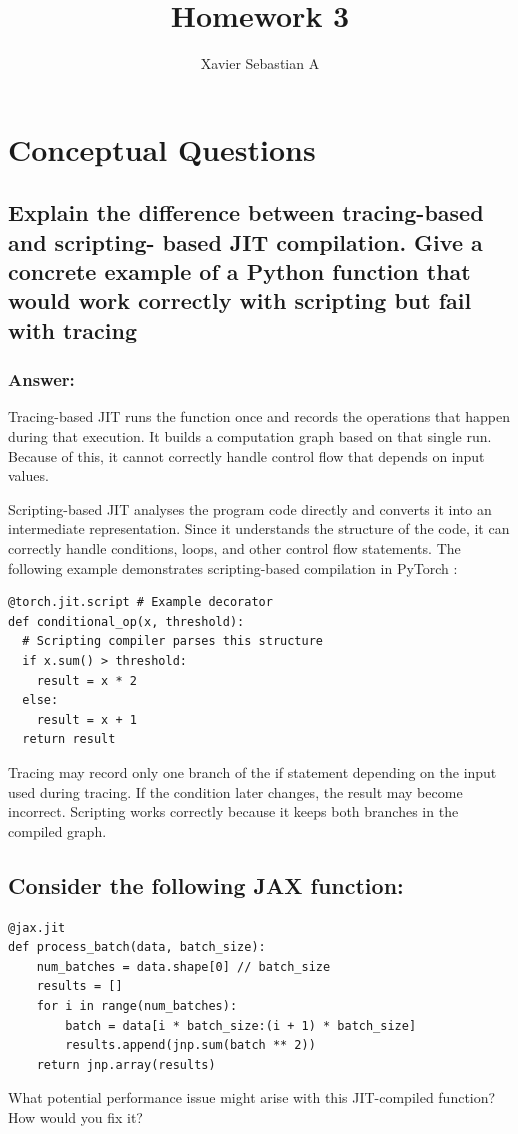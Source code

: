 \documentclass{article}
\title{Homework 3}
\author{Xavier Sebastian A}
\begin{document}
\maketitle
\section{Conceptual Questions}
\subsection{Explain the difference between tracing-based and scripting-
based JIT compilation. Give a concrete example of a Python function
that would work correctly with scripting but fail with tracing}
\subsubsection*{Answer:}
Tracing-based JIT runs the function once and records the operations that happen during that execution. 
It builds a computation graph based on that single run. 
Because of this, it cannot correctly handle control flow that depends on input values.

Scripting-based JIT analyses the program code directly and converts it into an intermediate representation. 
Since it understands the structure of the code, it can correctly handle conditions, loops, and other control flow statements.
The following example demonstrates scripting-based compilation in PyTorch \cite{jit_compilation_ml}:

\begin{lstlisting}[style=py]
@torch.jit.script # Example decorator
def conditional_op(x, threshold):
  # Scripting compiler parses this structure
  if x.sum() > threshold:
    result = x * 2
  else:
    result = x + 1
  return result
\end{lstlisting}
Tracing may record only one branch of the if statement depending on the input used during tracing. 
If the condition later changes, the result may become incorrect. 
Scripting works correctly because it keeps both branches in the compiled graph.

\subsection{Consider the following JAX function:}
\begin{lstlisting}[style=py]
@jax.jit
def process_batch(data, batch_size):
    num_batches = data.shape[0] // batch_size
    results = []
    for i in range(num_batches):
        batch = data[i * batch_size:(i + 1) * batch_size]
        results.append(jnp.sum(batch ** 2))
    return jnp.array(results)
\end{lstlisting}
What potential performance issue might arise with this JIT-compiled function? How would you fix it?
\end{document}
